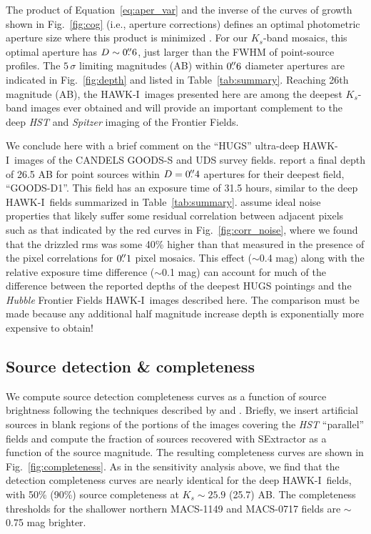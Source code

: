 \documentclass[preprint2]{aastex6}
\gdef\HAWKI{\mbox{HAWK-I}}
\begin{document}
The product of Equation~\ref{eq:aper_var} and the inverse of the curves of growth shown in Fig.~\ref{fig:cog} (i.e., aperture corrections) defines an optimal photometric aperture size where this product is minimized \citep{whitaker:nmbs}.  For our $K_s$-band mosaics, this optimal aperture has $D\sim0\mbox{$.\!\!^{\prime\prime}$}6$, just larger than the FWHM of point-source profiles.  The $5\,\sigma$ limiting magnitudes (AB) within $0\mbox{$.\!\!^{\prime\prime}$}6$ diameter apertures are indicated in Fig.~\ref{fig:depth} and listed in Table~\ref{tab:summary}.  Reaching 26th magnitude (AB), the \HAWKI\ images presented here are among the deepest $K_s$-band images ever obtained and will provide an important complement to the deep \textit{HST} and \textit{Spitzer} imaging of the Frontier Fields.  

We conclude here with a brief comment on the ``HUGS'' ultra-deep \HAWKI\ images of the CANDELS GOODS-S and UDS survey fields.  \cite{hugs} report a final depth of 26.5 AB for point sources within $D=0\mbox{$.\!\!^{\prime\prime}$}4$ apertures for their deepest field, ``GOODS-D1''.  This field has an exposure time of 31.5 hours, similar to the deep \HAWKI\ fields summarized in Table~\ref{tab:summary}.  \cite{hugs} assume ideal noise properties that likely suffer some residual correlation between adjacent pixels such as that indicated by the red curves in Fig.~\ref{fig:corr_noise}, where we found that the drizzled rms was some 40\% higher than that measured in the presence of the pixel correlations for $0\mbox{$.\!\!^{\prime\prime}$}1$ pixel mosaics.  This effect ($\sim$0.4 mag) along with the relative exposure time difference ($\sim$0.1 mag) can account for much of the difference between the reported depths of the deepest HUGS pointings and the \textit{Hubble} Frontier Fields \HAWKI\ images described here.  The comparison must be made because any additional half magnitude increase depth is exponentially more expensive to obtain!

\subsection{Source detection \& completeness}
\label{s:completeness}


We compute source detection completeness curves as a function of source brightness following the techniques described by \cite{whitaker:nmbs} and \cite{muzzin:13}.  Briefly, we insert artificial sources in blank regions of the portions of the images covering the \textit{HST} ``parallel'' fields and compute the fraction of sources recovered with SExtractor as a function of the source magnitude.  The resulting completeness curves are shown in Fig.~\ref{fig:completeness}.   As in the sensitivity analysis above, we find that the detection completeness curves are nearly identical for the deep \HAWKI\ fields, with 50\% (90\%) source completeness at $K_s\sim25.9$ (25.7) AB.  The completeness thresholds for the shallower northern MACS-1149 and MACS-0717 fields are $\sim$0.75 mag brighter.
\end{document}
